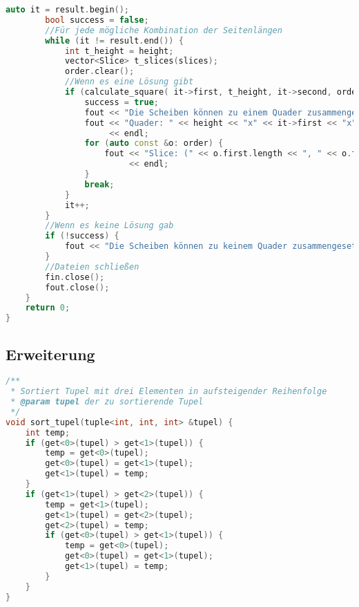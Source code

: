\documentclass[a4paper,10pt,ngerman]{scrartcl}
\begin{document}
\begin{lstlisting}[frame=single,language=C++,title=Methode main,breaklines=true,label={lst:code_main}]
        auto it = result.begin();
        bool success = false;
        //Für jede mögliche Kombination der Seitenlängen
        while (it != result.end()) {
            int t_height = height;
            vector<Slice> t_slices(slices);
            order.clear();
            //Wenn es eine Lösung gibt
            if (calculate_square( it->first, t_height, it->second, order, t_slices)) {
                success = true;
                fout << "Die Scheiben können zu einem Quader zusammengesetzt werden." << endl;
                fout << "Quader: " << height << "x" << it->first << "x" << it->second << " V(" << volume << ")" << endl
                     << endl;
                for (auto const &o: order) {
                    fout << "Slice: (" << o.first.length << ", " << o.first.height << ") Dimension: " << to_string(o.second)
                         << endl;
                }
                break;
            }
            it++;
        }
        //Wenn es keine Lösung gab
        if (!success) {
            fout << "Die Scheiben können zu keinem Quader zusammengesetzt werden." << endl;
        }
        //Dateien schließen
        fin.close();
        fout.close();
    }
    return 0;
}
    \end{lstlisting}

    \subsection{Erweiterung}\label{subsec:erweiterung}

    \begin{lstlisting}[frame=single,language=C++,title=Methode sort\_tupel,breaklines=true,label={lst:code_sortTupel}]
/**
 * Sortiert Tupel mit drei Elementen in aufsteigender Reihenfolge
 * @param tupel der zu sortierende Tupel
 */
void sort_tupel(tuple<int, int, int> &tupel) {
    int temp;
    if (get<0>(tupel) > get<1>(tupel)) {
        temp = get<0>(tupel);
        get<0>(tupel) = get<1>(tupel);
        get<1>(tupel) = temp;
    }
    if (get<1>(tupel) > get<2>(tupel)) {
        temp = get<1>(tupel);
        get<1>(tupel) = get<2>(tupel);
        get<2>(tupel) = temp;
        if (get<0>(tupel) > get<1>(tupel)) {
            temp = get<0>(tupel);
            get<0>(tupel) = get<1>(tupel);
            get<1>(tupel) = temp;
        }
    }
}
    \end{lstlisting}

    \newpage
\end{document}
